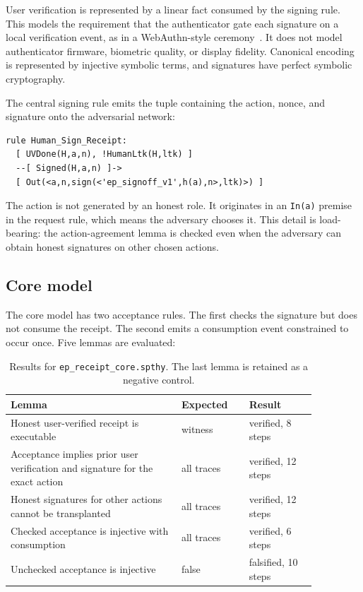 \documentclass[10.5pt]{article}
\newcommand{\code}[1]{\texttt{#1}}
\begin{document}
User verification is represented by a linear fact consumed by the signing rule.
This models the requirement that the authenticator gate each signature on a local
verification event, as in a WebAuthn-style ceremony~\cite{webauthn}. It does not
model authenticator firmware, biometric quality,
or display fidelity. Canonical encoding is represented by injective symbolic
terms, and signatures have perfect symbolic cryptography.

The central signing rule emits the tuple containing the action, nonce, and
signature onto the adversarial network:

\begin{Verbatim}[fontsize=\small]
rule Human_Sign_Receipt:
  [ UVDone(H,a,n), !HumanLtk(H,ltk) ]
  --[ Signed(H,a,n) ]->
  [ Out(<a,n,sign(<'ep_signoff_v1',h(a),n>,ltk)>) ]
\end{Verbatim}

The action is not generated by an honest role. It originates in an \code{In(a)}
premise in the request rule, which means the adversary chooses it. This detail is
load-bearing: the action-agreement lemma is checked even when the adversary can
obtain honest signatures on other chosen actions.

\subsection{Core model}

The core model has two acceptance rules. The first checks the signature but does
not consume the receipt. The second emits a consumption event constrained to
occur once. Five lemmas are evaluated:

\begin{table}[h]
\centering
\small
\begin{tabular}{p{0.48\linewidth}p{0.19\linewidth}p{0.19\linewidth}}
\toprule
Lemma & Expected & Result \\
\midrule
Honest user-verified receipt is executable & witness & verified, 8 steps \\
Acceptance implies prior user verification and signature for the exact action & all traces & verified, 12 steps \\
Honest signatures for other actions cannot be transplanted & all traces & verified, 12 steps \\
Checked acceptance is injective with consumption & all traces & verified, 6 steps \\
Unchecked acceptance is injective & false & falsified, 10 steps \\
\bottomrule
\end{tabular}
\caption{Results for \code{ep\_receipt\_core.spthy}. The last lemma is retained
as a negative control.}
\end{table}
\end{document}
